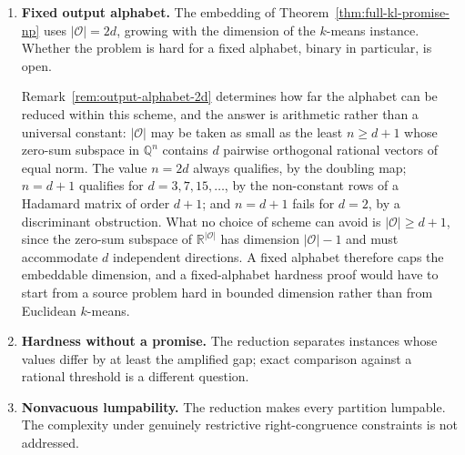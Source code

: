 \documentclass[12pt]{article}
\theoremstyle{definition}
\newcommand{\RetKL}{\Delta_{\mathrm{ret}}^{\mathrm{KL}}}
\begin{document}
\begin{enumerate}[leftmargin=2.0em]
\begin{enumerate}[label=(\alph*),leftmargin=2.0em]
Proposition~\ref{prop:full-kl-algebraic-form} locates the difficulty exactly.
For a fixed partition the whole sum collapses,
$\RetKL(\phi)=D^{-1}\log R$ with $D$ a positive integer and $R$ a positive
rational presented as a product of powers, so the comparison with $\tau$ is
equivalent to deciding $R\ge e^{D\tau}$.  The number of logarithmic terms is
therefore not the obstruction; the single rational-versus-exponential
comparison is.  That comparison is decidable, by
Lindemann--Weierstrass as recorded in
Remark~\ref{rem:full-kl-exp-membership}, and what is missing is a polynomial
bound on the precision needed to resolve it, equivalently a polynomial lower
bound on $|R-e^{D\tau}|$.  Remark~\ref{rem:full-kl-slp} shows that $R$ must be
kept in factored form for this to be a meaningful question, its expanded
numerator and denominator being of exponential bit size.  Consequently the
problem lies in NP as soon as this $\textup{\textsc{PosSLP}}$-type comparison admits
polynomial-time verifiable certificates.
\item \textbf{Fixed output alphabet.}  The embedding of
Theorem~\ref{thm:full-kl-promise-np} uses $|\mathcal O|=2d$, growing with the
dimension of the $k$-means instance.  Whether the problem is hard for a fixed
alphabet, binary in particular, is open.

Remark~\ref{rem:output-alphabet-2d} determines how far the alphabet can be
reduced within this scheme, and the answer is arithmetic rather than a
universal constant: $|\mathcal O|$ may be taken as small as the least
$n\ge d+1$ whose zero-sum subspace in $\mathbb Q^{n}$ contains $d$ pairwise
orthogonal rational vectors of equal norm.  The value $n=2d$ always qualifies,
by the doubling map; $n=d+1$ qualifies for $d=3,7,15,\dots$, by the
non-constant rows of a Hadamard matrix of order $d+1$; and $n=d+1$ fails for
$d=2$, by a discriminant obstruction.  What no choice of scheme can avoid is
$|\mathcal O|\ge d+1$, since the zero-sum subspace of
$\mathbb R^{|\mathcal O|}$ has dimension $|\mathcal O|-1$ and must accommodate
$d$ independent directions.  A fixed alphabet therefore caps the embeddable
dimension, and a fixed-alphabet hardness proof would have to start from a
source problem hard in bounded dimension rather than from Euclidean
$k$-means.
\item \textbf{Hardness without a promise.}  The reduction separates instances
whose values differ by at least the amplified gap; exact comparison against a
rational threshold is a different question.
\item \textbf{Nonvacuous lumpability.}  The reduction makes every partition
lumpable.  The complexity under genuinely restrictive right-congruence
constraints is not addressed.
\end{enumerate}


\end{enumerate}
\end{document}
